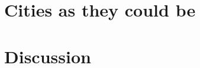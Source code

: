 \documentclass[letterpaper]{article}
\begin{document}
\section{Cities as they could be}








\section{Discussion}

%




\footnotesize

\end{document}
